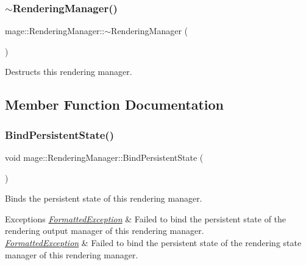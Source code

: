 \subsubsection{\texorpdfstring{$\sim$\+Rendering\+Manager()}{~RenderingManager()}}
{\footnotesize\ttfamily mage\+::\+Rendering\+Manager\+::$\sim$\+Rendering\+Manager (\begin{DoxyParamCaption}{ }\end{DoxyParamCaption})}

Destructs this rendering manager. 

\subsection{Member Function Documentation}
\hypertarget{classmage_1_1_rendering_manager_adadab213b9aabdc6167a012d340084a6}{}\label{classmage_1_1_rendering_manager_adadab213b9aabdc6167a012d340084a6} 
\subsubsection{\texorpdfstring{Bind\+Persistent\+State()}{BindPersistentState()}}
{\footnotesize\ttfamily void mage\+::\+Rendering\+Manager\+::\+Bind\+Persistent\+State (\begin{DoxyParamCaption}{ }\end{DoxyParamCaption})}

Binds the persistent state of this rendering manager.


\begin{DoxyExceptions}{Exceptions}
{\em \hyperlink{classmage_1_1_formatted_exception}{Formatted\+Exception}} & Failed to bind the persistent state of the rendering output manager of this rendering manager. \\
\hline
{\em \hyperlink{classmage_1_1_formatted_exception}{Formatted\+Exception}} & Failed to bind the persistent state of the rendering state manager of this rendering manager. \\
\hline
\end{DoxyExceptions}
\hypertarget{classmage_1_1_rendering_manager_a920fdd741d160b687ecac1d892f8bfd1}{}\label{classmage_1_1_rendering_manager_a920fdd741d160b687ecac1d892f8bfd1} 
